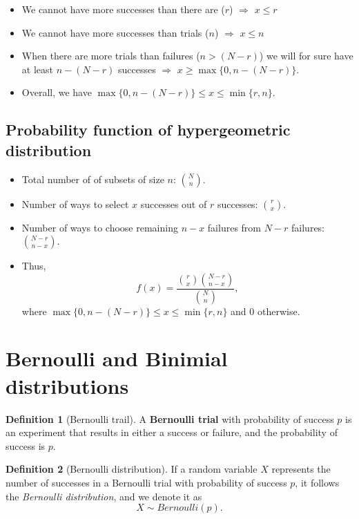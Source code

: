 \documentclass[
]{book}
\providecommand{\tightlist}{%
  \setlength{\itemsep}{0pt}\setlength{\parskip}{0pt}}
\theoremstyle{definition}
\newtheorem{definition}{Definition}[chapter]
\theoremstyle{definition}
\theoremstyle{definition}
\theoremstyle{definition}
\theoremstyle{remark}
\begin{document}
\begin{itemize}
\tightlist
\item
  We cannot have more successes than there are (\(r\)) \(\Rightarrow\) \(x\leq r\)
\item
  We cannot have more successes than trials (\(n\)) \(\Rightarrow\) \(x\leq n\)
\item
  When there are more trials than failures (\(n>(N-r)\)) we will for sure have at least \(n-(N-r)\) successes \(\Rightarrow\) \(x\geq \max\{0, n-(N-r)\}\).
\item
  Overall, we have \textbf{\(\max\{0, n-(N-r)\} \leq x \leq \min\{r,n\}\)}.
\end{itemize}

\hypertarget{probability-function-of-hypergeometric-distribution}{%
\subsection{Probability function of hypergeometric distribution}\label{probability-function-of-hypergeometric-distribution}}

\begin{itemize}
\tightlist
\item
  Total number of of subsets of size \(n\): \(\binom{N}{n}\).
\item
  Number of ways to select \(x\) successes out of \(r\) successes: \(\binom{r}{x}\).
\item
  Number of ways to choose remaining \(n-x\) failures from \(N-r\) failures: \(\binom{N-r}{n-x}\).
\item
  Thus,
  \[f(x) = \frac{\binom{r}{x}\binom{N-r}{n-x}}{\binom{N}{n}},\]
  where \(\max\{0, n-(N-r)\} \leq x \leq \min\{r,n\}\) and 0 otherwise.
\end{itemize}

\hypertarget{bernoulli-and-binimial-distributions}{%
\section{Bernoulli and Binimial distributions}\label{bernoulli-and-binimial-distributions}}

\begin{definition}[Bernoulli trail]
A \textbf{Bernoulli trial} with probability of success \(p\) is an experiment that results in either a success or failure, and the probability of success is \(p\).
\end{definition}

\begin{definition}[Bernoulli distribution]
If a random variable \(X\) represents the number of successes in a Bernoulli trial with probability of success \(p\), it follows the \emph{Bernoulli distribution}, and we denote it as
\[
X \sim Bernoulli(p).
\]
\end{definition}
\end{document}
